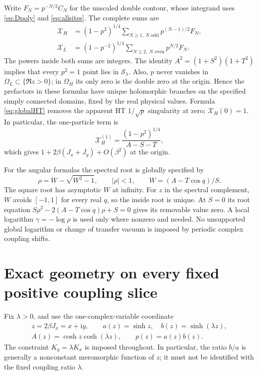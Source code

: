 \documentclass[11pt]{article}
\numberwithin{equation}{section}
\theoremstyle{definition}
\newcommand{\ii}{\mathrm i}
\newcommand{\cS}{\mathcal S}
\newcommand{\OH}{\Omega_H}
\newcommand{\OL}{\Omega_L}
\newcommand{\XH}{\mathcal X_H}
\newcommand{\XL}{\mathcal X_L}
\begin{document}
Write $F_N=p^{-N/2}C_N$ for the unscaled double contour, whose integrand
uses \eqref{eq:Dpoly} and \eqref{eq:allsites}. The complete sums are
\begin{align}
 \XH&=(1-p^2)^{1/4}\sum_{N\ge1,\ N\text{ odd}}p^{(N-1)/2}F_N,
                                                        \label{eq:globalHT}\\
 \XL&=(1-p^{-2})^{1/4}\sum_{N\ge2,\ N\text{ even}}p^{N/2}F_N.
                                                        \label{eq:globalLT}
\end{align}
The powers inside both sums are integers. The identity
$A^2=(1+S^2)(1+T^2)$ implies that every $p^2=1$ point lies in
$\cS_\lambda$. Also, $p$ never vanishes in $\OL\subset\{\Re z>0\}$;
in $\OH$ its only zero is the double zero at the origin. Hence the
prefactors in these formulas have unique holomorphic branches on the
specified simply connected domains, fixed by the real physical values.
Formula \eqref{eq:globalHT} removes the apparent HT $1/\sqrt p$
singularity at zero; $\XH(0)=1$. In particular, the one-particle term is
\[
 \XH^{(1)}=\frac{(1-p^2)^{1/4}}{A-S-T},
\]
which gives $1+2\beta(J_x+J_y)+O(\beta^2)$ at the origin.

For the angular formulas the spectral root is globally specified by
\[
 \rho=W-\sqrt{W^2-1},\qquad |\rho|<1,
 \qquad W=(A-T\cos q)/S.
\]
The square root has asymptotic $W$ at infinity. For $z$ in the spectral
complement, $W$ avoids $[-1,1]$ for every real $q$, so the inside root
is unique. At $S=0$ its root equation
$S\rho^2-2(A-T\cos q)\rho+S=0$ gives its removable value zero.
A local logarithm $\gamma=-\log\rho$ is used only where nonzero and
needed. No unsupported global logarithm or change of transfer vacuum
is imposed by periodic complex coupling shifts.



\section{Exact geometry on every fixed positive coupling slice}\label{sec:geometry}

Fix \(\lambda>0\), and use the one-complex-variable coordinate
\begin{gather*}
 z=2\beta J_x=x+\ii y,\qquad
 a(z)=\sinh z,\quad b(z)=\sinh(\lambda z),\\
 A(z)=\cosh z\cosh(\lambda z),\qquad p(z)=a(z)b(z).
\end{gather*}
The constraint \(K_y=\lambda K_x\) is imposed throughout. In particular,
the ratio \(b/a\) is generally a nonconstant meromorphic function of
\(z\); it must not be identified with the fixed coupling ratio
\(\lambda\).
\end{document}
